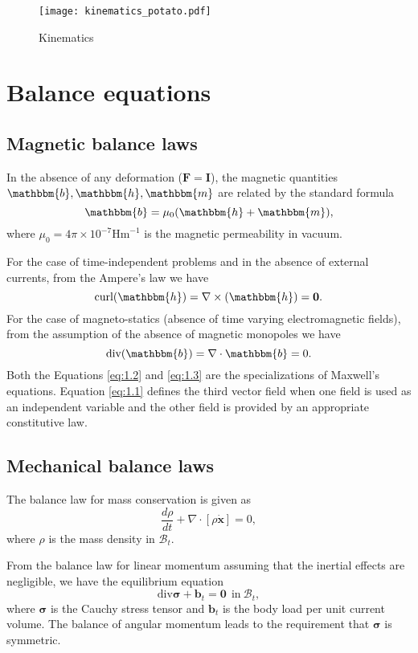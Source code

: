 \begin{figure}[h]
\centering 
\texttt{[image: kinematics\_potato.pdf]}
\caption{Kinematics}
\label{fig:1.1}
\end{figure} 

\section{Balance equations}
\subsection{Magnetic balance laws}
In the absence of any deformation ($\mathbf{F} = \mathbf{I}$), the magnetic quantities $\mathbbm{b}, \mathbbm{h}, \mathbbm{m}$ are related by the standard formula
\begin{equation}
\mathbbm{b} = \mu_0 (\mathbbm{h} + \mathbbm{m}),
\label{eq:1.1}
\end{equation}
where $\mu_0 = 4\pi \times 10^{-7} \text{Hm}^{-1}$ is the magnetic permeability in vacuum. \par 
For the case of time-independent problems and in the absence of external currents, from the Ampere's law we have \cite{KANKANALA} 
\begin{equation}
\text{curl} (\mathbbm{h}) = \nabla \times (\mathbbm{h}) = \mathbf{0}.
\label{eq:1.2}
\end{equation}
For the case of magneto-statics (absence of time varying electromagnetic fields), from the assumption of the absence of magnetic monopoles we have \cite{KANKANALA}\begin{equation}
\text{div}(\mathbbm{b}) = \nabla \cdot \mathbbm{b} = 0.
\label{eq:1.3}
\end{equation}
Both the Equations \eqref{eq:1.2} and \eqref{eq:1.3} are the specializations of Maxwell's equations. Equation \eqref{eq:1.1} defines the third vector field when one field is used as an independent variable and the other field is provided by an appropriate constitutive law. 

\subsection{Mechanical balance laws}
The balance law for mass conservation is given as 
\begin{equation}
\frac{d\rho}{dt} + \nabla \cdot [\rho \mathbf{\dot{x}}] = 0,
\end{equation}
where $\rho$ is the mass density in $\mathcal{B}_t$. \par 
From the balance law for linear momentum assuming that the inertial effects are negligible, we have the equilibrium equation 
\begin{equation}
\text{div} \bm{\sigma} + \bm{b}_t = \mathbf{0} \ \ \text{in} \ \mathcal{B}_t,
\end{equation}
where $\bm{\sigma}$ is the Cauchy stress tensor and $\bm{b}_t$ is the body load per unit current volume. The balance of angular momentum leads to the requirement that $\bm{\sigma}$ is symmetric. 

